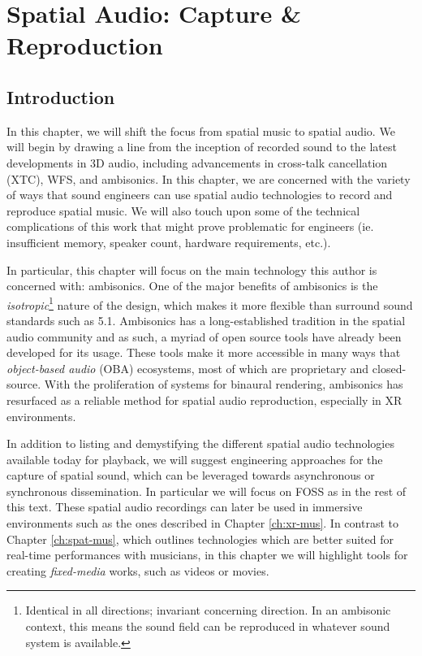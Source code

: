 \chapter{Spatial Audio: Capture \& Reproduction} \label{ch:spat-aud}

\section{Introduction}

In this chapter, we will shift the focus from spatial music to spatial audio. We will begin by drawing a line from the inception of recorded sound to the latest developments in 3D audio, including advancements in cross-talk cancellation (XTC), WFS, and ambisonics. In this chapter, we are concerned with the variety of ways that sound engineers can use spatial audio technologies to record and reproduce spatial music. We will also touch upon some of the technical complications of this work that might prove problematic for engineers (ie. insufficient memory, speaker count, hardware requirements, etc.).

In particular, this chapter will focus on the main technology this author is concerned with: ambisonics. One of the major benefits of ambisonics is the \textit{isotropic}\footnote{Identical in all directions; invariant concerning direction. In an ambisonic context, this means the sound field can be reproduced in whatever sound system is available.} nature of the design, which makes it more flexible than surround sound standards such as 5.1. Ambisonics has a long-established tradition in the spatial audio community and as such, a myriad of open source tools have already been developed for its usage. These tools make it more accessible in many ways that \textit{object-based audio} (OBA) ecosystems, most of which are proprietary and closed-source. With the proliferation of systems for binaural rendering, ambisonics has resurfaced as a reliable method for spatial audio reproduction, especially in XR environments.

In addition to listing and demystifying the different spatial audio technologies available today for playback, we will suggest engineering approaches for the capture of spatial sound, which can be leveraged towards asynchronous or synchronous dissemination. In particular we will focus on FOSS as in the rest of this text. These spatial audio recordings can later be used in immersive environments such as the ones described in Chapter \ref{ch:xr-mus}. In contrast to Chapter \ref{ch:spat-mus}, which outlines technologies which are better suited for real-time performances with musicians, in this chapter we will highlight tools for creating \textit{fixed-media} works, such as videos or movies.

